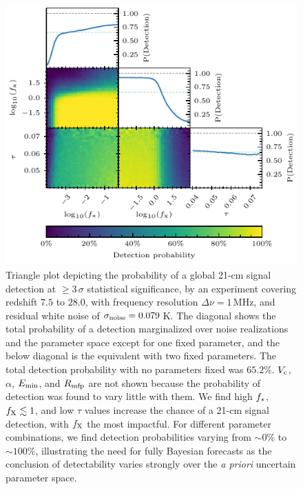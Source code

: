 \documentclass[twocolumn,english,aps,prl,amsmath,amssymb,reprint,footinbib,floatfix,showkeys]{revtex4-2}
\begin{document}
\begin{figure}
\includegraphics{figures/detectability_triangle_3_sigma_noise_0.0790_K.pdf}
    \caption{Triangle plot depicting the probability of a global 21-cm signal detection at $\geq 3$\,$\sigma$ statistical significance, by an experiment covering redshift $7.5$ to $28.0$, with frequency resolution $\Delta \nu = 1$\,MHz, and residual white noise of \mbox{$\sigma_{\rm noise} = 0.079$\,K}.
The diagonal shows the total probability of a detection marginalized over noise realizations and the parameter space except for one fixed parameter, and the below diagonal is the equivalent with two fixed parameters. 
The total detection probability with no parameters fixed was $65.2$\%.
$V_{\rm c}$, $\alpha$, $E_{\rm min}$, and $R_{\rm mfp}$ are not shown because the probability of detection was found to vary little with them. 
We find high $f_{\rm *}$, $f_{\rm X} \lesssim 1$, and low $\tau$ values increase the chance of a 21-cm signal detection, with $f_{\rm X}$ the most impactful.  
For different parameter combinations, we find detection probabilities varying from $\sim 0$\% to $\sim 100$\%, illustrating the need for fully Bayesian forecasts as the conclusion of detectability varies strongly over the \textit{a priori} uncertain parameter space. }
\label{fig:headline_plot}
\end{figure}
\end{document}
